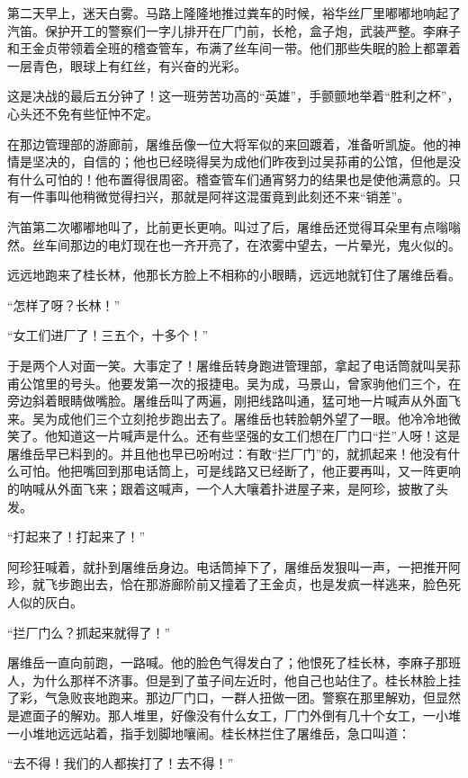 \par 第二天早上，迷天白雾。马路上隆隆地推过粪车的时候，裕华丝厂里嘟嘟地响起了汽笛。保护开工的警察们一字儿排开在厂门前，长枪，盒子炮，武装严整。李麻子和王金贞带领着全班的稽查管车，布满了丝车间一带。他们那些失眠的脸上都罩着一层青色，眼球上有红丝，有兴奋的光彩。
\par 这是决战的最后五分钟了！这一班劳苦功高的“英雄”，手颤颤地举着“胜利之杯”，心头还不免有些怔忡不定。
\par 在那边管理部的游廊前，屠维岳像一位大将军似的来回踱着，准备听凯旋。他的神情是坚决的，自信的；他也已经晓得吴为成他们昨夜到过吴荪甫的公馆，但他是没有什么可怕的！他布置得很周密。稽查管车们通宵努力的结果也是使他满意的。只有一件事叫他稍微觉得扫兴，那就是阿祥这混蛋竟到此刻还不来“销差”。
\par 汽笛第二次嘟嘟地叫了，比前更长更响。叫过了后，屠维岳还觉得耳朵里有点嗡嗡然。丝车间那边的电灯现在也一齐开亮了，在浓雾中望去，一片晕光，鬼火似的。
\par 远远地跑来了桂长林，他那长方脸上不相称的小眼睛，远远地就钉住了屠维岳看。
\par “怎样了呀？长林！”
\par “女工们进厂了！三五个，十多个！”
\par 于是两个人对面一笑。大事定了！屠维岳转身跑进管理部，拿起了电话筒就叫吴荪甫公馆里的号头。他要发第一次的报捷电。吴为成，马景山，曾家驹他们三个，在旁边斜着眼睛做嘴脸。屠维岳叫了两遍，刚把线路叫通，猛可地一片喊声从外面飞来。吴为成他们三个立刻抢步跑出去了。屠维岳也转脸朝外望了一眼。他冷冷地微笑了。他知道这一片喊声是什么。还有些坚强的女工们想在厂门口“拦”人呀！这是屠维岳早已料到的。并且他也早已吩咐过：有敢“拦厂门”的，就抓起来！他没有什么可怕。他把嘴回到那电话筒上，可是线路又已经断了，他正要再叫，又一阵更响的呐喊从外面飞来；跟着这喊声，一个人大嚷着扑进屋子来，是阿珍，披散了头发。
\par “打起来了！打起来了！”
\par 阿珍狂喊着，就扑到屠维岳身边。电话筒掉下了，屠维岳发狠叫一声，一把推开阿珍，就飞步跑出去，恰在那游廊阶前又撞着了王金贞，也是发疯一样逃来，脸色死人似的灰白。
\par “拦厂门么？抓起来就得了！”
\par 屠维岳一直向前跑，一路喊。他的脸色气得发白了；他恨死了桂长林，李麻子那班人，为什么那样不济事。但是到了茧子间左近时，他自己也站住了。桂长林脸上挂了彩，气急败丧地跑来。那边厂门口，一群人扭做一团。警察在那里解劝，但显然是遮面子的解劝。那人堆里，好像没有什么女工，厂门外倒有几十个女工，一小堆一小堆地远远站着，指手划脚地嚷闹。桂长林拦住了屠维岳，急口叫道：
\par “去不得！我们的人都挨打了！去不得！”
